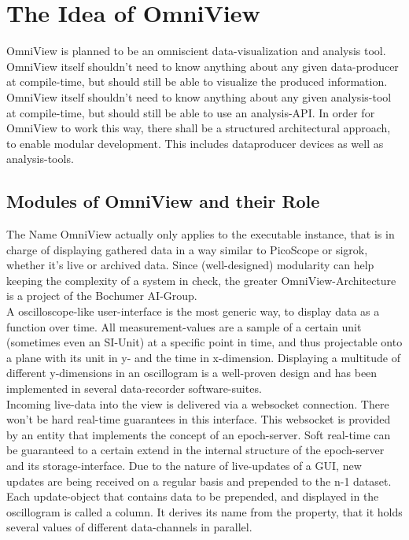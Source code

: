 \documentclass{scrreprt}
\begin{document}
\chapter{The Idea of OmniView}
OmniView is planned to be an omniscient data-visualization and analysis tool. 
OmniView itself shouldn't need to know anything about any given data-producer at compile-time, but should still be able to visualize the produced information.
OmniView itself shouldn't need to know anything about any given analysis-tool at compile-time, but should still be able to use an analysis-API. 
In order for OmniView to work this way, there shall be a structured architectural approach, to enable modular development.
This includes dataproducer devices as well as analysis-tools.

\section[Modules]{Modules of OmniView and their Role}
The Name OmniView actually only applies to the executable instance, that is in charge of displaying gathered data in a way similar to PicoScope or sigrok, whether it's live or archived data. 
Since (well-designed) modularity can help keeping the complexity of a system in check, the greater OmniView-Architecture is a project of the Bochumer AI-Group.
\\
A oscilloscope-like user-interface is the most generic way, to display data as a function over time. 
All measurement-values are a sample of a certain unit (sometimes even an SI-Unit) at a specific point in time, and thus projectable onto a plane with its unit in y- and the time in x-dimension. 
Displaying a multitude of different y-dimensions in an oscillogram is a well-proven design and has been implemented in several data-recorder software-suites. 
\\
Incoming live-data into the view is delivered via a websocket connection.
There won't be hard real-time guarantees in this interface. 
This websocket is provided by an entity that implements the concept of an epoch-server.
Soft real-time can be guaranteed to a certain extend in the internal structure of the epoch-server and its storage-interface.
Due to the nature of live-updates of a GUI, new updates are being received on a regular basis and prepended to the n-1 dataset.
Each update-object that contains data to be prepended, and displayed in the oscillogram is called a column. 
It derives its name from the property, that it holds several values of different data-channels in parallel.
\end{document}
